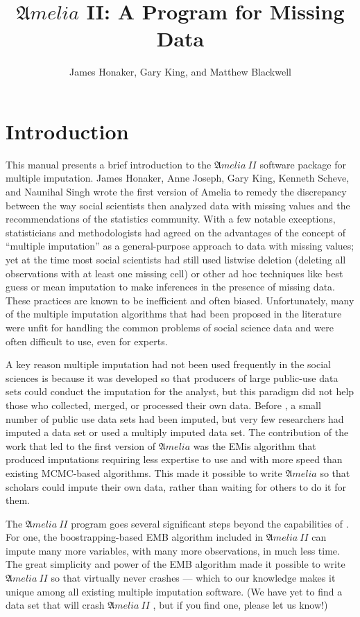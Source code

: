 \documentclass[12pt,titlepage]{article}
\title{${\mathfrak Amelia}$ II: A Program for Missing Data}
\author{James Honaker, Gary King, and Matthew Blackwell}
\newcommand{\Amelia}{\ensuremath{\mathfrak Amelia} }
\newcommand{\AmeliaII}{\ensuremath{\mathfrak Amelia~II} }
\begin{document}
\maketitle

\tableofcontents
\newpage



\section{Introduction}
\label{sec:intro}

This manual presents a brief introduction to the \AmeliaII software
package for multiple imputation.  James Honaker, Anne Joseph, Gary
King, Kenneth Scheve, and Naunihal Singh wrote the first version of
Amelia to remedy the discrepancy between the way social scientists
then analyzed data with missing values and the recommendations of the
statistics community.  With a few notable exceptions, statisticians
and methodologists had agreed on the advantages of the concept of
``multiple imputation'' as a general-purpose approach to data with
missing values; yet at the time most social scientists had still used
listwise deletion (deleting all observations with at least one missing
cell) or other ad hoc techniques like best guess or mean imputation to
make inferences in the presence of missing data.  These practices are
known to be inefficient and often biased.  Unfortunately, many of the
multiple imputation algorithms that had been proposed in the
literature were unfit for handling the common problems of social
science data and were often difficult to use, even for experts.

A key reason multiple imputation had not been used frequently in the
social sciences is because it was developed so that producers of large
public-use data sets could conduct the imputation for the analyst, but
this paradigm did not help those who collected, merged, or processed
their own data.  Before \citet*{KinHonJos01}, a small number of public
use data sets had been imputed, but very few researchers had imputed a
data set or used a multiply imputed data set.  The contribution of the
work that led to the first version of \Amelia was the EMis algorithm
that produced imputations requiring less expertise to use and with
more speed than existing MCMC-based algorithms.  This made it possible
to write \Amelia so that scholars could impute their own data, rather
than waiting for others to do it for them.

The \AmeliaII program goes several significant steps beyond the
capabilities of \AmeliaI.  For one, the boostrapping-based EMB
algorithm included in \AmeliaII can impute many more variables, with
many more observations, in much less time.  The great simplicity and
power of the EMB algorithm made it possible to write \AmeliaII so that
virtually never crashes --- which to our knowledge makes it unique
among all existing multiple imputation software.  (We have yet to find
a data set that will crash \AmeliaII, but if you find one, please let
us know!)
\end{document}
